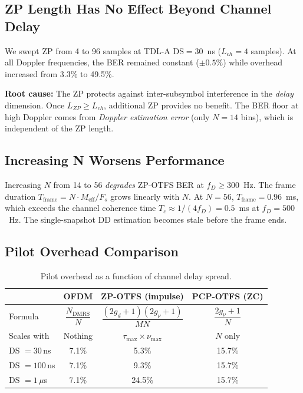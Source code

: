 \documentclass[11pt,a4paper,twoside]{article}
\begin{document}
\subsection{ZP Length Has No Effect Beyond Channel Delay}

We swept ZP from 4 to 96 samples at TDL-A DS$= 30$~ns ($L_{ch} = 4$ samples). At all Doppler frequencies, the BER remained constant ($\pm 0.5\%$) while overhead increased from 3.3\% to 49.5\%.

\textbf{Root cause:} The ZP protects against inter-subsymbol interference in the \emph{delay} dimension. Once $L_{ZP} \geq L_{ch}$, additional ZP provides no benefit. The BER floor at high Doppler comes from \emph{Doppler estimation error} (only $N = 14$ bins), which is independent of the ZP length.

\subsection{Increasing N Worsens Performance}

Increasing $N$ from 14 to 56 \emph{degrades} ZP-OTFS BER at $f_D \geq 300$~Hz. The frame duration $T_{\text{frame}} = N \cdot M_{\text{eff}} / F_s$ grows linearly with $N$. At $N = 56$, $T_{\text{frame}} = 0.96$~ms, which exceeds the channel coherence time $T_c \approx 1/(4 f_D) = 0.5$~ms at $f_D = 500$~Hz. The single-snapshot DD estimation becomes stale before the frame ends.

\subsection{Pilot Overhead Comparison}

\begin{table}[h]
\centering
\caption{Pilot overhead as a function of channel delay spread.}
\label{tab:overhead}
\begin{tabular}{lccc}
\toprule
& OFDM & ZP-OTFS (impulse) & PCP-OTFS (ZC) \\
\midrule
Formula & $\dfrac{N_{\text{DMRS}}}{N}$ & $\dfrac{(2g_d+1)(2g_\nu+1)}{MN}$ & $\dfrac{2g_\nu+1}{N}$ \\[8pt]
Scales with & Nothing & $\tau_{\max} \times \nu_{\max}$ & $N$ only \\[3pt]
DS $= 30$\,ns & 7.1\% & 5.3\% & 15.7\% \\
DS $= 100$\,ns & 7.1\% & 9.3\% & 15.7\% \\
DS $= 1\,\mu$s & 7.1\% & 24.5\% & 15.7\% \\
\bottomrule
\end{tabular}
\end{table}
\end{document}
